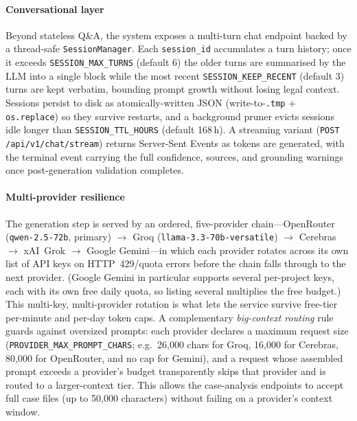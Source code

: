 \documentclass[final,1p,times]{elsarticle}
\newcommand{\ar}[1]{{\arabicfont\beginR #1\endR}}
\begin{document}
\paragraph{Conversational layer} Beyond stateless Q\&A, the system exposes a
multi-turn chat endpoint backed by a thread-safe \texttt{SessionManager}.
Each \texttt{session\_id} accumulates a turn history; once it exceeds
\texttt{SESSION\_MAX\_TURNS} (default 6) the older turns are summarised by the
LLM into a single \ar{[ملخص المحادثة السابقة]} block while the most recent
\texttt{SESSION\_KEEP\_RECENT} (default 3) turns are kept verbatim, bounding
prompt growth without losing legal context. Sessions persist to disk as
atomically-written JSON (write-to-\texttt{.tmp} + \texttt{os.replace}) so they
survive restarts, and a background pruner evicts sessions idle longer than
\texttt{SESSION\_TTL\_HOURS} (default 168\,h). A streaming variant
(\texttt{POST /api/v1/chat/stream}) returns Server-Sent Events as tokens are
generated, with the terminal event carrying the full confidence, sources, and
grounding warnings once post-generation validation completes.

\paragraph{Multi-provider resilience} The generation step is served by an
ordered, five-provider chain---OpenRouter (\texttt{qwen-2.5-72b}, primary)
$\rightarrow$ Groq (\texttt{llama-3.3-70b-versatile}) $\rightarrow$ Cerebras
$\rightarrow$ xAI~Grok $\rightarrow$ Google Gemini---in which each provider
rotates across its own list of API keys on HTTP~429/quota errors before the
chain falls through to the next provider. (Google Gemini in particular supports
several per-project keys, each with its own free daily quota, so listing several
multiplies the free budget.) This multi-key, multi-provider rotation is what
lets the service survive free-tier per-minute and per-day token caps. A
complementary \emph{big-context routing} rule guards against oversized prompts:
each provider declares a maximum request size (\texttt{PROVIDER\_MAX\_PROMPT\_CHARS};
e.g.\ 26{,}000 chars for Groq, 16{,}000 for Cerebras, 80{,}000 for OpenRouter,
and no cap for Gemini), and a request whose assembled prompt exceeds a provider's
budget transparently skips that provider and is routed to a larger-context tier.
This allows the case-analysis endpoints to accept full case files (up to 50{,}000
characters) without failing on a provider's context window.
\end{document}
